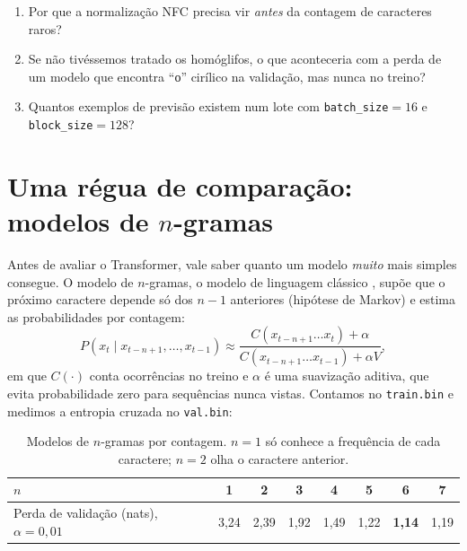 \documentclass[11pt,a4paper]{article}
\begin{document}
\begin{exercicios}
\begin{enumerate}
\item Por que a normalização NFC precisa vir \emph{antes} da contagem de caracteres raros?
\item Se não tivéssemos tratado os homóglifos, o que aconteceria com a perda de um modelo que encontra ``о'' cirílico na validação, mas nunca no treino?
\item Quantos exemplos de previsão existem num lote com \texttt{batch\_size}$=16$ e \texttt{block\_size}$=128$?
\end{enumerate}
\end{exercicios}

\section{Uma régua de comparação: modelos de $n$-gramas}
\label{sec:ngramas}

Antes de avaliar o Transformer, vale saber quanto um modelo \emph{muito} mais simples consegue. O modelo de $n$-gramas, o modelo de linguagem clássico \cite[cap.~3]{jurafsky}, supõe que o próximo caractere depende só dos $n-1$ anteriores (hipótese de Markov) e estima as probabilidades por contagem:
\begin{equation}
P(x_t \mid x_{t-n+1}, \dots, x_{t-1}) \approx \frac{C(x_{t-n+1}\dots x_t) + \alpha}{C(x_{t-n+1}\dots x_{t-1}) + \alpha V},
\end{equation}
em que $C(\cdot)$ conta ocorrências no treino e $\alpha$ é uma suavização aditiva, que evita probabilidade zero para sequências nunca vistas. Contamos no \texttt{train.bin} e medimos a entropia cruzada no \texttt{val.bin}:

\begin{table}[H]
\centering
\begin{tabular}{@{}lccccccc@{}}
\toprule
$n$ & 1 & 2 & 3 & 4 & 5 & 6 & 7 \\
\midrule
Perda de validação (nats), $\alpha = 0{,}01$ & 3,24 & 2,39 & 1,92 & 1,49 & 1,22 & \textbf{1,14} & 1,19 \\
\bottomrule
\end{tabular}
\caption{Modelos de $n$-gramas por contagem. $n=1$ só conhece a frequência de cada caractere; $n=2$ olha o caractere anterior.}
\label{tab:ngramas}
\end{table}
\end{document}
